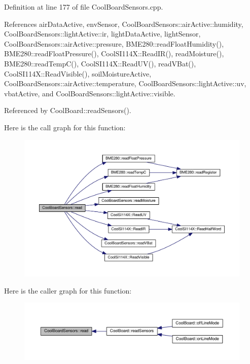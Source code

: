Definition at line 177 of file Cool\+Board\+Sensors.\+cpp.



References air\+Data\+Active, env\+Sensor, Cool\+Board\+Sensors\+::air\+Active\+::humidity, Cool\+Board\+Sensors\+::light\+Active\+::ir, light\+Data\+Active, light\+Sensor, Cool\+Board\+Sensors\+::air\+Active\+::pressure, B\+M\+E280\+::read\+Float\+Humidity(), B\+M\+E280\+::read\+Float\+Pressure(), Cool\+S\+I114\+X\+::\+Read\+I\+R(), read\+Moisture(), B\+M\+E280\+::read\+Temp\+C(), Cool\+S\+I114\+X\+::\+Read\+U\+V(), read\+V\+Bat(), Cool\+S\+I114\+X\+::\+Read\+Visible(), soil\+Moisture\+Active, Cool\+Board\+Sensors\+::air\+Active\+::temperature, Cool\+Board\+Sensors\+::light\+Active\+::uv, vbat\+Active, and Cool\+Board\+Sensors\+::light\+Active\+::visible.



Referenced by Cool\+Board\+::read\+Sensors().

Here is the call graph for this function\+:
\nopagebreak
\begin{figure}[H]
\begin{center}
\leavevmode
\includegraphics[width=350pt]{de/d46/class_cool_board_sensors_a91badb2539d91fda8679f2a597874c48_cgraph}
\end{center}
\end{figure}
Here is the caller graph for this function\+:
\nopagebreak
\begin{figure}[H]
\begin{center}
\leavevmode
\includegraphics[width=350pt]{de/d46/class_cool_board_sensors_a91badb2539d91fda8679f2a597874c48_icgraph}
\end{center}
\end{figure}
\mbox{\label{class_cool_board_sensors_aa432c5aac88f89c31a10766390f23e0b}} 
